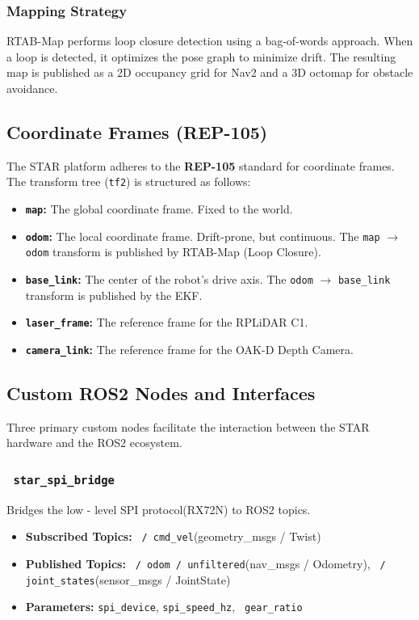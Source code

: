 \subsubsection{Mapping Strategy}
RTAB-Map performs loop closure detection using a bag-of-words approach. When a loop is detected, it optimizes the pose graph to minimize drift. The resulting map is published as a 2D occupancy grid for Nav2 and a 3D octomap for obstacle avoidance.

\subsection{Coordinate Frames (REP-105)}

The STAR platform adheres to the \textbf{REP-105} standard for coordinate frames. The transform tree (\texttt{tf2}) is structured as follows:

\begin{itemize}
    \item \textbf{\texttt{map}:} The global coordinate frame. Fixed to the world.
    \item \textbf{\texttt{odom}:} The local coordinate frame. Drift-prone, but continuous. The \texttt{map} $\rightarrow$ \texttt{odom} transform is published by RTAB-Map (Loop Closure).
    \item \textbf{\texttt{base\_link}:} The center of the robot's drive axis. The \texttt{odom} $\rightarrow$ \texttt{base\_link} transform is published by the EKF.
    \item \textbf{\texttt{laser\_frame}:} The reference frame for the RPLiDAR C1.
    \item \textbf{\texttt{camera\_link}:} The reference frame for the OAK-D Depth Camera.
\end{itemize}

    \subsection{Custom ROS2 Nodes and Interfaces}

    Three primary custom nodes facilitate the interaction between the
        STAR hardware and the ROS2 ecosystem.

\subsubsection{\texttt { star\_spi\_bridge}
   }
    Bridges the low - level SPI protocol(RX72N)
    to ROS2 topics.
\begin{itemize}
    \item \textbf{Subscribed Topics:}
    \texttt{ / cmd\_vel}(geometry\_msgs / Twist)
    \item \textbf{Published Topics:
   }
    \texttt{ / odom / unfiltered}(nav\_msgs / Odometry), \texttt{
        / joint\_states}(sensor\_msgs / JointState)
    \item \textbf{Parameters:
   }
    \texttt{spi\_device}, \texttt{spi\_speed\_hz}, \texttt { gear\_ratio}
    \end{itemize}

